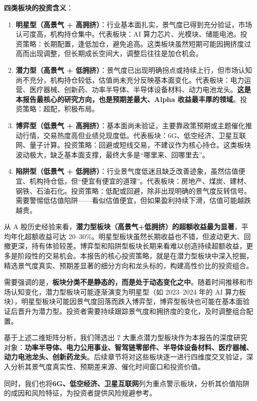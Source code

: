 \textbf{四类板块的投资含义}：

\begin{enumerate}[leftmargin=2em]
\item \textbf{明星型（高景气 + 高拥挤）}：行业基本面扎实，景气度已得到充分验证，市场认可度高，机构持仓集中。代表板块：AI 算力芯片、光模块、储能电池。投资策略：长期配置，逢低加仓，避免追高。这类板块虽然短期可能因拥挤度过高而出现调整，但长期成长空间大，调整后往往是加仓机会。
\item \textbf{潜力型（高景气 + 低拥挤）}：景气度已出现明确拐点或持续上行，但市场认知尚不充分，机构持仓较低，估值尚未充分反映基本面变化。代表板块：电力运营、医疗器械、创新药、功率半导体、半导体设备材料、动力电池龙头。\textbf{这是本报告最核心的研究方向，也是预期差最大、Alpha 收益最丰厚的领域}。投资策略：超配，积极布局。
\item \textbf{博弈型（低景气 + 高拥挤）}：基本面尚未验证，主要靠政策预期或主题催化推动行情，交易热度高但业绩兑现度低。代表板块：6G、低空经济、卫星互联网、量子计算。投资策略：回避或短线交易，不建议作为核心持仓。这类板块波动极大，缺乏基本面支撑，最终大多是``哪里来、回哪里去''。
\item \textbf{陷阱型（低景气 + 低拥挤）}：行业景气度低迷且缺乏改善迹象，虽然估值便宜、机构持仓低，但``便宜有便宜的道理''。代表板块：房地产、煤炭、建材、钢铁、石油石化。投资策略：低配或回避，除非出现明确的景气度反转信号。需要警惕低估值陷阱——看似估值便宜，但如果盈利持续下滑，估值可能越跌越贵。
\end{enumerate}

\begin{keyinsight}[潜力型板块是超额收益的核心来源]
从 A 股历史经验来看，\textbf{潜力型板块（高景气+低拥挤）的超额收益最为显著}，平均年化超额收益可达 20--30\%。明星型板块虽然长期收益也不错，但波动更大、回撤更深，持有体验较差。博弈型和陷阱型板块长期来看难以创造持续超额收益，更多是阶段性的交易机会。本报告的核心投资策略，就是在潜力型板块中深入挖掘，精选景气度真实、预期差显著的细分方向和龙头标的，构建高性价比的投资组合。
\end{keyinsight}

需要强调的是，\textbf{板块分类不是静态的，而是处于动态变化之中}。随着时间推移和市场认知变化，潜力型板块可能逐渐演变为明星型（如 2023--2024 年的 AI 算力板块），明星型板块可能因景气度回落而跌入博弈型，博弈型板块也可能在基本面验证后晋升为潜力型。投资者需要持续跟踪景气度和拥挤度的变化，及时调整组合配置。

\smallskip

基于上述二维矩阵分析，我们筛选出 7 大重点潜力型板块作为本报告的深度研究对象：\textbf{功率半导体、电力公用事业、智驾链零部件、半导体设备材料、医疗器械、动力电池龙头、创新药龙头}。后续章节将对这些板块逐一进行四维度交叉验证，深入分析其景气度真实性、预期差来源、催化时间窗口和投资价值。

\smallskip

同时，我们也将\textbf{6G、低空经济、卫星互联网}列为重点警示板块，分析其价值陷阱的成因和风险特征，为投资者提供风险规避参考。
